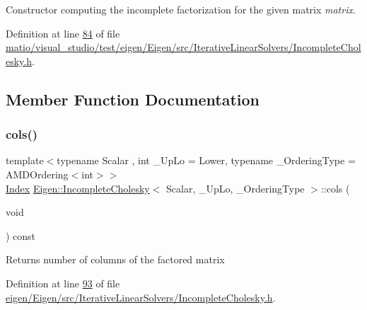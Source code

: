 Constructor computing the incomplete factorization for the given matrix {\itshape matrix}. 

Definition at line \hyperlink{matio_2visual__studio_2test_2eigen_2_eigen_2src_2_iterative_linear_solvers_2_incomplete_cholesky_8h_source_l00084}{84} of file \hyperlink{matio_2visual__studio_2test_2eigen_2_eigen_2src_2_iterative_linear_solvers_2_incomplete_cholesky_8h_source}{matio/visual\+\_\+studio/test/eigen/\+Eigen/src/\+Iterative\+Linear\+Solvers/\+Incomplete\+Cholesky.\+h}.



\subsection{Member Function Documentation}
\mbox{\label{class_eigen_1_1_incomplete_cholesky_a0d66a1c8e340617e7ff404e63186fedb}} 
\subsubsection{\texorpdfstring{cols()}{cols()}\hspace{0.1cm}{\footnotesize\ttfamily [1/2]}}
{\footnotesize\ttfamily template$<$typename Scalar , int \+\_\+\+Up\+Lo = Lower, typename \+\_\+\+Ordering\+Type  = A\+M\+D\+Ordering$<$int$>$$>$ \\
\hyperlink{namespace_eigen_a62e77e0933482dafde8fe197d9a2cfde}{Index} \hyperlink{class_eigen_1_1_incomplete_cholesky}{Eigen\+::\+Incomplete\+Cholesky}$<$ Scalar, \+\_\+\+Up\+Lo, \+\_\+\+Ordering\+Type $>$\+::cols (\begin{DoxyParamCaption}\item[{void}]{ }\end{DoxyParamCaption}) const\hspace{0.3cm}{\ttfamily [inline]}}

\begin{DoxyReturn}{Returns}
number of columns of the factored matrix 
\end{DoxyReturn}


Definition at line \hyperlink{eigen_2_eigen_2src_2_iterative_linear_solvers_2_incomplete_cholesky_8h_source_l00093}{93} of file \hyperlink{eigen_2_eigen_2src_2_iterative_linear_solvers_2_incomplete_cholesky_8h_source}{eigen/\+Eigen/src/\+Iterative\+Linear\+Solvers/\+Incomplete\+Cholesky.\+h}.

